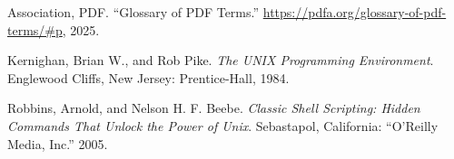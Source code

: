 \documentclass[
  letterpaper,
]{tufte-handout}
\newlength{\cslhangindent}
\newenvironment{CSLReferences}[2] %
 {\begin{list}{}{%
  \setlength{\itemindent}{0pt}
  \setlength{\leftmargin}{0pt}
  \setlength{\parsep}{0pt}
  \ifodd #1
   \setlength{\leftmargin}{\cslhangindent}
   \setlength{\itemindent}{-1\cslhangindent}
  \fi
  \setlength{\itemsep}{#2\baselineskip}}}
 {\end{list}}
\begin{document}
\label{refs}
\begin{CSLReferences}{1}{0}
Association, PDF. {``Glossary of PDF Terms.''}
\url{https://pdfa.org/glossary-of-pdf-terms/\#p}, 2025.

Kernighan, Brian W., and Rob Pike. \emph{The UNIX Programming
Environment}. Englewood Cliffs, New Jersey: Prentice-Hall, 1984.

Robbins, Arnold, and Nelson H. F. Beebe. \emph{Classic Shell Scripting:
Hidden Commands That Unlock the Power of Unix}. Sebastapol, California:
{``O'Reilly Media, Inc.''} 2005.

\end{CSLReferences}
\end{document}
